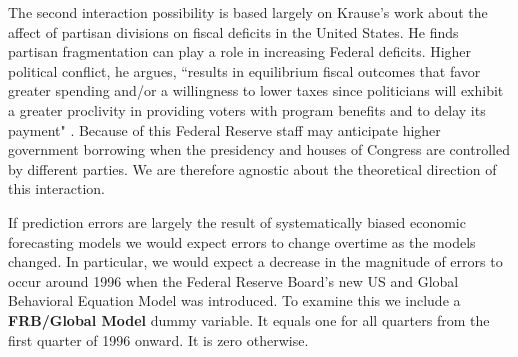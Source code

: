 \documentclass[a4paper]{article}\usepackage{graphicx, color}
\begin{document}
The second interaction possibility is based largely on Krause's \citeyearpar{Krause2000} work about the affect of partisan divisions on fiscal deficits in the United States. He finds partisan fragmentation can play a role in increasing Federal deficits. Higher political conflict, he argues, ``results in equilibrium fiscal outcomes that favor greater spending and/or a willingness to lower taxes since politicians will exhibit a greater proclivity in providing voters with program benefits and to delay its payment" \citep[][542]{Krause2000}. Because of this Federal Reserve staff may anticipate higher government borrowing when the presidency and houses of Congress are controlled by different parties. We are therefore agnostic about the theoretical direction of this interaction.

If prediction errors are largely the result of systematically biased economic forecasting models we would expect errors to change overtime as the models changed. In particular, we would expect a decrease in the magnitude of errors to occur around 1996 when the Federal Reserve Board's new US and Global Behavioral Equation Model was introduced. To examine this we include a {\bf{FRB/Global Model}} dummy variable. It equals one for all quarters from the first quarter of 1996 onward. It is zero otherwise.
\end{document}
